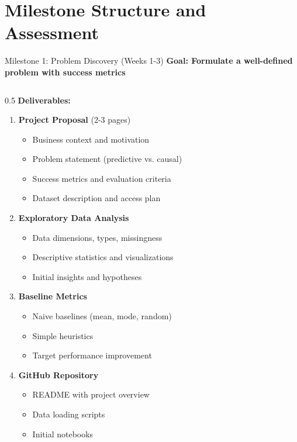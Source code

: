 
\section{Milestone Structure and Assessment}


\begin{frame}{Milestone 1: Problem Discovery (Weeks 1-3)}
\textbf{Goal: Formulate a well-defined problem with success metrics}

\begin{columns}
\begin{column}{0.5\textwidth}
\textbf{Deliverables:}

\begin{enumerate}
\item \textbf{Project Proposal} (2-3 pages)
   \begin{itemize}
   \item Business context and motivation
   \item Problem statement (predictive vs. causal)
   \item Success metrics and evaluation criteria
   \item Dataset description and access plan
   \end{itemize}

\item \textbf{Exploratory Data Analysis}
   \begin{itemize}
   \item Data dimensions, types, missingness
   \item Descriptive statistics and visualizations
   \item Initial insights and hypotheses
   \end{itemize}

\item \textbf{Baseline Metrics}
   \begin{itemize}
   \item Naive baselines (mean, mode, random)
   \item Simple heuristics
   \item Target performance improvement
   \end{itemize}

\item \textbf{GitHub Repository}
   \begin{itemize}
   \item README with project overview
   \item Data loading scripts
   \item Initial notebooks
   \end{itemize}
\end{enumerate}
\end{column}


\end{columns}
\end{frame}
